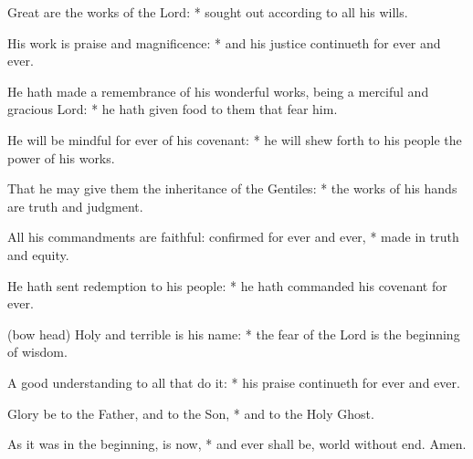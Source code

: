 ﻿\item Great are the works of the Lord: * sought out according to all his wills.
\item  His work is praise and magnificence: * and his justice continueth for ever and ever.
\item  He hath made a remembrance of his wonderful works, being a merciful and gracious Lord: * he hath given food to them that fear him.
\item  He will be mindful for ever of his covenant: * he will shew forth to his people the power of his works.
\item  That he may give them the inheritance of the Gentiles: * the works of his hands are truth and judgment.
\item  All his commandments are faithful: confirmed for ever and ever, * made in truth and equity.
\item  He hath sent redemption to his people: * he hath commanded his covenant for ever.
\item  (bow head) Holy and terrible is his name: * the fear of the Lord is the beginning of wisdom.
\item  A good understanding to all that do it: * his praise continueth for ever and ever.
\item Glory be to the Father, and to the Son, * and to the Holy Ghost.
\item As it was in the beginning, is now, * and ever shall be, world without end. Amen.